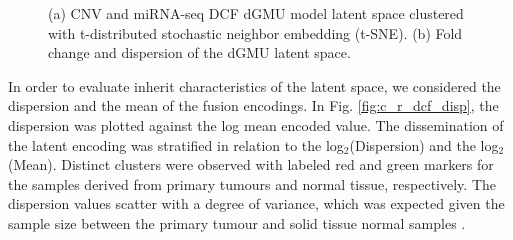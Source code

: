 \begin{figure}[h!]
        \centering
        
        \hfill
         
        \caption{(a) CNV and miRNA-seq DCF dGMU model latent space clustered with t-distributed stochastic neighbor embedding (t-SNE). (b) Fold change and dispersion of the dGMU latent space.}
        \label{fig:visLate}
\end{figure}


In order to evaluate inherit characteristics of the latent space, we considered the dispersion and the mean of the fusion encodings. In Fig. \ref{fig:c_r_dcf_disp}, the dispersion was plotted against the log mean encoded value. The dissemination of the latent encoding was stratified in relation to the log$_2$(Dispersion) and the log$_2$(Mean). Distinct clusters were observed with labeled red and green markers for the samples derived from primary tumours and normal tissue, respectively. The dispersion values scatter with a degree of variance, which was expected given the sample size between the primary tumour and solid tissue normal samples \cite{jiang2014statistical}.

